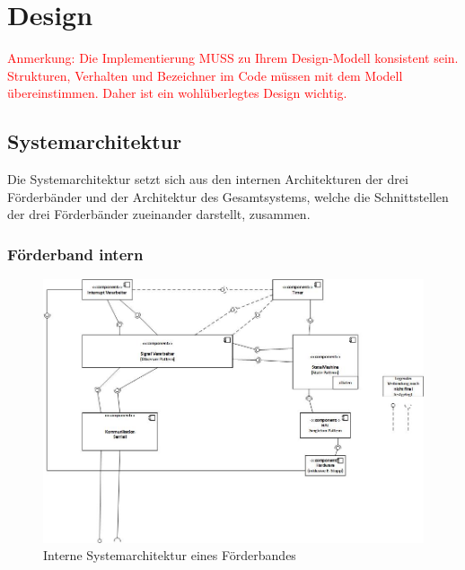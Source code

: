 \documentclass[a4paper, 11pt]{article}
\begin{document}
\section{Design}
\textcolor{red}{Anmerkung: Die Implementierung MUSS zu Ihrem Design-Modell konsistent sein. Strukturen, Verhalten und Bezeichner im Code müssen mit dem Modell übereinstimmen. Daher ist ein wohlüberlegtes Design wichtig.}

\newpage

\subsection{Systemarchitektur}
Die Systemarchitektur setzt sich aus den internen Architekturen der drei Förderbänder und der Architektur des Gesamtsystems, welche die Schnittstellen der drei Förderbänder zueinander darstellt, zusammen.

\subsubsection{Förderband intern}

\begin{figure}[h]
\centering 
\includegraphics[scale=0.7]{images/SW_Architektur/Foerderband.jpg}
\caption{Interne Systemarchitektur eines Förderbandes}
\label{archintern}
\end{figure}
\end{document}
